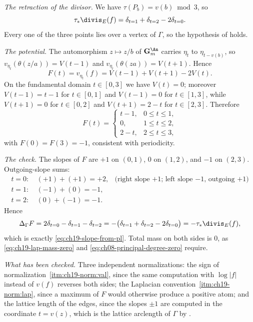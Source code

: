 \begin{example}
\emph{The retraction of the divisor.}  We have $\tau(P_b)=v(b)\bmod3$, so
\[
 \tau_*\divis_E(f)=\delta_{t=1}+\delta_{t=2}-2\delta_{t=0}.
\]
Every one of the three points lies over a vertex of $\Gamma$, so the
hypothesis of  holds.

\emph{The potential.}  The automorphism $z\mapsto z/b$ of
$\mathbf G_m^{\An}$ carries $\eta_t$ to $\eta_{t-v(b)}$, so
$v_{\eta_t}(\theta(z/a))=V(t-1)$ and
$v_{\eta_t}(\theta(za))=V(t+1)$.  Hence
\[
 F(t)=v_{\eta_t}(f)=V(t-1)+V(t+1)-2V(t).
\]
On the fundamental domain $t\in[0,3]$ we have $V(t)=0$; moreover
$V(t-1)=t-1$ for $t\in[0,1]$ and $V(t-1)=0$ for $t\in[1,3]$, while
$V(t+1)=0$ for $t\in[0,2]$ and $V(t+1)=2-t$ for $t\in[2,3]$.
Therefore
\begin{equation}
\label{eq:ch19-tate-slope-potential}
 F(t)=
 \begin{cases}
  t-1, & 0\leq t\leq1,\\
  0,   & 1\leq t\leq2,\\
  2-t, & 2\leq t\leq3,
 \end{cases}
\end{equation}
with $F(0)=F(3)=-1$, consistent with periodicity.

\emph{The check.}  The slopes of $F$ are $+1$ on $(0,1)$, $0$ on
$(1,2)$, and $-1$ on $(2,3)$.  Outgoing-slope sums:
\[
\begin{array}{lcl}
 t=0: & \ (+1)+(+1)=+2, &\text{(right slope $+1$; left slope $-1$, outgoing $+1$)}\\
 t=1: & \ (-1)+(0)=-1,  &\\
 t=2: & \ (0)+(-1)=-1.  &
\end{array}
\]
Hence
\[
 \Delta_\Gamma F=2\delta_{t=0}-\delta_{t=1}-\delta_{t=2}
   =-\bigl(\delta_{t=1}+\delta_{t=2}-2\delta_{t=0}\bigr)
   =-\tau_*\divis_E(f),
\]
which is exactly \eqref{eq:ch19-slope-from-pl}.  Total mass on both sides is
$0$, as \eqref{eq:ch19-lap-mass-zero} and
\eqref{eq:ch08-principal-degree-zero} require.

\emph{What has been checked.}  Three independent normalizations:
the sign of normalization~\cref{itm:ch19-norm:val}, since the same computation with
$\log|f|$ instead of $v(f)$ reverses both sides; the Laplacian
convention~\cref{itm:ch19-norm:lap}, since a maximum of $F$ would otherwise
produce a positive atom; and the lattice length of the edges, since the
slopes $\pm1$ are computed in the coordinate $t=v(z)$, which is the
lattice arclength of $\Gamma$ by .
\end{example}

